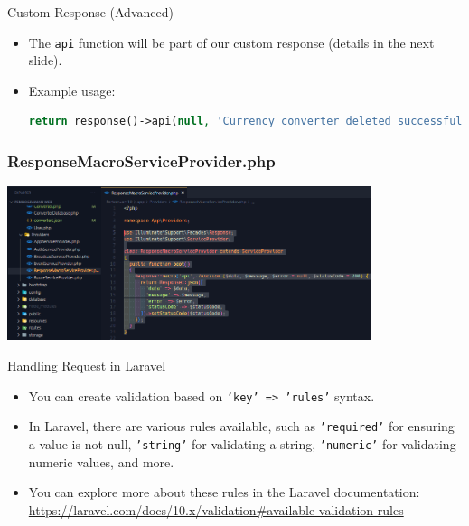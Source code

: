 \documentclass[aspectratio=169, table]{beamer}
\begin{document}
\begin{frame}[fragile]{Custom Response (Advanced)}
    \begin{itemize}
\item The \texttt{api} function will be part of our custom response (details in the next slide).
        \item Example usage:
        \begin{lstlisting}[language=PHP]
return response()->api(null, 'Currency converter deleted successfully', null, Response::HTTP_OK);
        \end{lstlisting}
    \end{itemize}
\end{frame}


\begin{frame}[fragile]
 \frametitle{ResponseMacroServiceProvider.php}
 \vskip1cm
 \begin{center}
  \includegraphics[width=0.8\textwidth]{classFiles/pertemuan-10-custom-response.png}
 \end{center}
\end{frame}

\begin{frame}[fragile]{Handling Request in Laravel}
    \begin{itemize}
        \item You can create validation based on \texttt{'key' => 'rules'} syntax.
        \item In Laravel, there are various rules available, such as \texttt{'required'} for ensuring a value is not null, \texttt{'string'} for validating a string, \texttt{'numeric'} for validating numeric values, and more.
        \item You can explore more about these rules in the Laravel documentation: \url{https://laravel.com/docs/10.x/validation#available-validation-rules}
    \end{itemize}
\end{frame}
\end{document}
